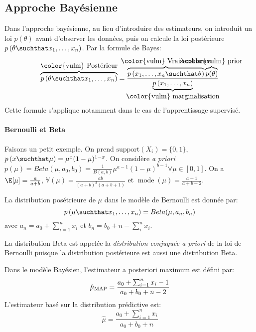 \documentclass[info, math, french]{mpb-cours}
\def\model#1#2{p\left(#1\suchthat#2\right)}
\def\V{\mathbb{V}}
\def\define#1{\emph{\textcolor{vulm}{#1}}}
\def\eqanot#1{\makebox[0pt]{\mbox{\color{vulm} \normalfont #1}}}
\DeclareMathOperator{\mode}{mode}
\begin{document}
\subsection{Approche Bayésienne}
Dans l'approche bayésienne, au lieu d'introduire des estimateurs, on introduit un loi $p(\theta)$ avant d'observer les données, puis on calcule la loi postérieure $\model{\theta}{x_{1}, \ldots, x_{n}}$.
Par la formule de Bayes:
\begin{equation}
	\overbrace{\model{\theta}{x_{1}, \ldots, x_{n}}}^{\eqanot{Postérieur}} = \frac{\overbrace{\model{x_{1}, \ldots, x_{n}}{\theta}}^{\eqanot{Vraisemblance}}\overbrace{p(\theta)}^{\eqanot{prior}}}{\underbrace{p\left(x_{1}, \ldots, x_{n}\right)}_{\eqanot{marginalisation}}}
\end{equation}
Cette formule s'applique notamment dans le cas de l'apprentissage supervisé.

\paragraph{Bernoulli et Beta}
Faisons un petit exemple. On prend $\mathrm{support}(X_{i}) = \{0, 1\}$, $\model{x}{\mu} = \mu^{x}(1 - \mu)^{1 - x}$.
On considère \emph{a priori} $p(\mu) = Beta(\mu, a_{0}, b_{0}) = \frac{1}{B(a, b)}\mu^{a -1}(1 - \mu)^{b - 1}\forall \mu \in [0, 1]$.
On a $\E[\mu] = \frac{a}{a + b}$, $\V(\mu) = \frac{ab}{(a + b)^{2}(a + b + 1)}$ et $\mode(\mu) = \frac{a - 1}{a + b - 2}$.

\begin{proposition}
	La distribution posétrieure de $\mu$ dans le modèle de Bernoulli est donnée par:
	\begin{equation*}
		\model{\mu}{x_{1}, \ldots, x_{n}} = Beta(\mu, a_{n}, b_{n})
	\end{equation*}
	avec $a_{n} = a_{0} + \sum_{i = 1}^{n}x_{i}$ et $b_{n} = b_{0} + n - \sum_{i}^{n}x_{i}$.
\end{proposition}

\begin{definition}
	La distribution Beta est appelée la \define{distribution conjuguée a priori} de la loi de Bernoulli puisque la distribution postérieure est aussi une distribution Beta.
\end{definition}

Dans le modèle Bayésien, l'estimateur a posteriori maximum est défini par:
\begin{equation*}
	\hat{\mu}_{\rm MAP} = \frac{a_{0} + \sum_{i = 1}^{n}x_{i} - 1}{a_{0} + b_{0} + n - 2}
\end{equation*}
L'estimateur basé sur la distribution prédictive est:
\begin{equation*}
	\hat{\mu} = \frac{a_{0} + \sum_{i = 1}^{n}x_{i}}{a_{0} + b_{0} + n}
\end{equation*}
\end{document}
